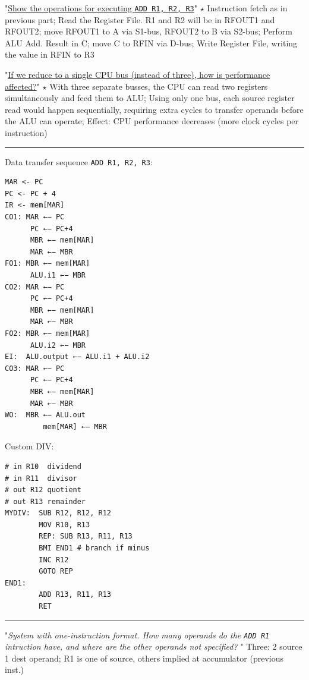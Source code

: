 \documentclass[a4paper]{article}
\begin{document}
\begin{multicols*}{2}
\begin{minipage}{0.25\textwidth}
    "\ul{Show the operations for executing \texttt{ADD R1, R2, R3}}"
    $\star$ Instruction fetch as in previous part; Read the Register File. R1 and R2 will be in RFOUT1 and RFOUT2; move RFOUT1 to A via S1-bus, RFOUT2 to B via S2-bus; Perform ALU Add. Result in C; move C to RFIN via D-bus; Write Register File, writing the value in RFIN to R3

    "\ul{If we reduce to a single CPU bus (instead of three), how is performance affected?}"
    $\star$ With three separate busses, the CPU can read two registers simultaneously and feed them to ALU; Using only one bus, each source register read would happen sequentially, requiring extra cycles to transfer operands before the ALU can operate; Effect: CPU performance decreases (more clock cycles per instruction)
  \end{minipage}

  \rule{1\linewidth}{0.4pt}

  \begin{minipage}{0.2\textwidth}
    Data transfer sequence \texttt{ADD R1, R2, R3}:
    \begin{verbatim}MAR <- PC
PC <- PC + 4  
IR <- mem[MAR] 
CO1: MAR ←− PC
      PC ←− PC+4
      MBR ←− mem[MAR]
      MAR ←− MBR
FO1: MBR ←− mem[MAR]
      ALU.i1 ←− MBR
CO2: MAR ←− PC
      PC ←− PC+4
      MBR ←− mem[MAR]
      MAR ←− MBR
FO2: MBR ←− mem[MAR]
      ALU.i2 ←− MBR
EI:  ALU.output ←− ALU.i1 + ALU.i2
CO3: MAR ←− PC
      PC ←− PC+4
      MBR ←− mem[MAR]
      MAR ←− MBR
WO:  MBR ←− ALU.out
         mem[MAR] ←− MBR
    \end{verbatim}
  \end{minipage}
  \begin{minipage}{0.25\textwidth}
    Custom DIV:
    \begin{verbatim}
# in R10  dividend
# in R11  divisor
# out R12 quotient 
# out R13 remainder 
MYDIV:  SUB R12, R12, R12
        MOV R10, R13
        REP: SUB R13, R11, R13
        BMI END1 # branch if minus
        INC R12
        GOTO REP
END1:
        ADD R13, R11, R13
        RET
        \end{verbatim}
  \end{minipage}

  \rule{1\linewidth}{0.4pt}

  "\textit{System with one-instruction format. How many operands do the \texttt{ADD R1} intruction have, and where are the other operands not specified? }"
  Three: 2 source 1 dest operand; R1 is one of source, others implied at accumulator (previous inst.)


\end{multicols*}
\end{document}
